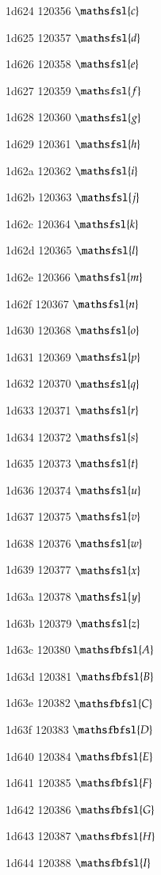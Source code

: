 \documentclass[11pt]{article}
\begin{document}
1d624 120356 \ensuremath{\mathsfsl{c}}

1d625 120357 \ensuremath{\mathsfsl{d}}

1d626 120358 \ensuremath{\mathsfsl{e}}

1d627 120359 \ensuremath{\mathsfsl{f}}

1d628 120360 \ensuremath{\mathsfsl{g}}

1d629 120361 \ensuremath{\mathsfsl{h}}

1d62a 120362 \ensuremath{\mathsfsl{i}}

1d62b 120363 \ensuremath{\mathsfsl{j}}

1d62c 120364 \ensuremath{\mathsfsl{k}}

1d62d 120365 \ensuremath{\mathsfsl{l}}

1d62e 120366 \ensuremath{\mathsfsl{m}}

1d62f 120367 \ensuremath{\mathsfsl{n}}

1d630 120368 \ensuremath{\mathsfsl{o}}

1d631 120369 \ensuremath{\mathsfsl{p}}

1d632 120370 \ensuremath{\mathsfsl{q}}

1d633 120371 \ensuremath{\mathsfsl{r}}

1d634 120372 \ensuremath{\mathsfsl{s}}

1d635 120373 \ensuremath{\mathsfsl{t}}

1d636 120374 \ensuremath{\mathsfsl{u}}

1d637 120375 \ensuremath{\mathsfsl{v}}

1d638 120376 \ensuremath{\mathsfsl{w}}

1d639 120377 \ensuremath{\mathsfsl{x}}

1d63a 120378 \ensuremath{\mathsfsl{y}}

1d63b 120379 \ensuremath{\mathsfsl{z}}

1d63c 120380 \ensuremath{\mathsfbfsl{A}}

1d63d 120381 \ensuremath{\mathsfbfsl{B}}

1d63e 120382 \ensuremath{\mathsfbfsl{C}}

1d63f 120383 \ensuremath{\mathsfbfsl{D}}

1d640 120384 \ensuremath{\mathsfbfsl{E}}

1d641 120385 \ensuremath{\mathsfbfsl{F}}

1d642 120386 \ensuremath{\mathsfbfsl{G}}

1d643 120387 \ensuremath{\mathsfbfsl{H}}

1d644 120388 \ensuremath{\mathsfbfsl{I}}
\end{document}
